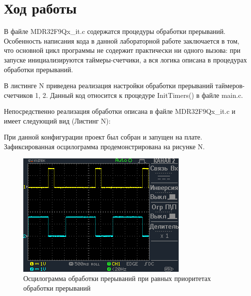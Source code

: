\documentclass[14pt,a4paper,report]{report}
\begin{document}
\section {Ход работы}


%
%
В файле  MDR32F9Qx\_it.c содержатся процедуры обработки прерываний. Особенность написания кода в данной лабораторной работе заключается в том, что основной цикл программы не содержит практически ни одного вызова: при запуске инициализируются таймеры-счетчики, а вся логика описана в процедурах обработки прерываний.

В листинге N приведена реализация настройки обработки прерываний таймеров-счетчиков 1, 2. Данный код относится к процедуре InitTimers() в файле main.c.



Непосредственно реализация обработки описана в файле MDR32F9Qx\_it.c и имеет следующий вид (Листинг N):



При данной конфигурации проект был собран и запущен на плате. Зафиксированная осцилограмма продемонстрирована на рисунке N.

\begin{figure}[h!]
	\centering
	\includegraphics[scale = 1]{img/2_1.png}
	\caption{Осцилограмма обработки прерываний при равных приоритетах обработки прерываний}
\end{figure}
\end{document}
